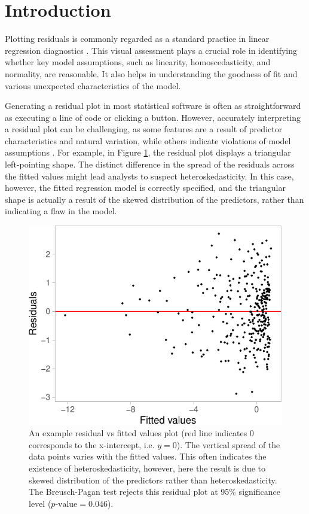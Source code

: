 \documentclass[]{interact}
\theoremstyle{plain}%
\theoremstyle{definition}
\theoremstyle{remark}
\begin{document}
\section{Introduction}\label{sec-model-introduction}

Plotting residuals is commonly regarded as a standard practice in linear
regression diagnostics \citep{belsley1980regression, cook1982residuals}.
This visual assessment plays a crucial role in identifying whether key
model assumptions, such as linearity, homoscedasticity, and normality,
are reasonable. It also helps in understanding the goodness of fit and
various unexpected characteristics of the model.

Generating a residual plot in most statistical software is often as
straightforward as executing a line of code or clicking a button.
However, accurately interpreting a residual plot can be challenging, as
some features are a result of predictor characteristics and natural
variation, while others indicate violations of model assumptions
\citep{li2024plot}. For example, in Figure \ref{fig:false-finding}, the
residual plot displays a triangular left-pointing shape. The distinct
difference in the spread of the residuals across the fitted values might
lead analysts to suspect heteroskedasticity. In this case, however, the
fitted regression model is correctly specified, and the triangular shape
is actually a result of the skewed distribution of the predictors,
rather than indicating a flaw in the model.

\begin{figure}[!h]

{\centering \includegraphics[width=0.5\linewidth]{paper_files/figure-latex/false-finding-1} 

}

\caption{An example residual vs fitted values plot (red line indicates 0 corresponds to the x-intercept, i.e. $y=0$). The vertical spread of the data points varies with the fitted values. This often indicates the existence of heteroskedasticity, however, here the result is due to skewed distribution of the predictors rather than heteroskedasticity. The Breusch-Pagan test rejects this residual plot at 95\% significance level ($p\text{-value} = 0.046$).}\label{fig:false-finding}
\end{figure}
\end{document}

